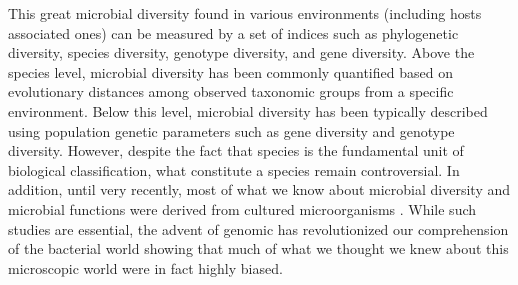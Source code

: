 This great microbial diversity found in various environments (including hosts associated ones) can be measured by a set of indices such as phylogenetic diversity, species diversity, genotype diversity, and gene diversity. Above the species level, microbial diversity has been commonly quantified based on evolutionary distances among observed taxonomic groups from a specific environment. Below this level, microbial diversity has been typically described using population genetic parameters such as gene diversity and genotype diversity. However, despite the fact that species is the fundamental unit of biological classification, what constitute a species remain controversial. In addition, until very recently, most of what we know about microbial diversity and microbial functions were derived from cultured microorganisms . While such studies are essential, the advent of genomic has revolutionized our comprehension of the bacterial world showing that much of what we thought we knew about this microscopic world were in fact highly biased.\\

